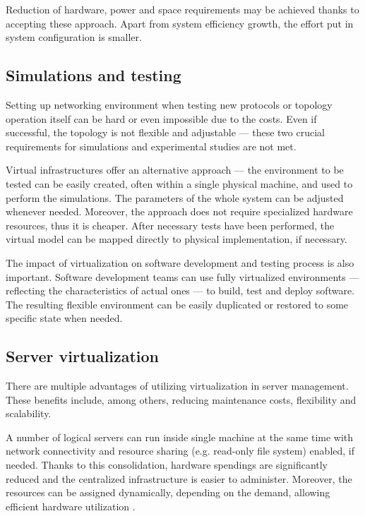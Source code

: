 \documentclass[11pt,openany]{book}
\begin{document}
      Reduction of hardware, power and space requirements may be achieved thanks to accepting these approach. Apart from
      system efficiency growth, the effort put in system configuration is smaller.


      \subsection{Simulations and testing}

        Setting up networking environment when testing new protocols or topology operation itself can be hard or even
        impossible due to the costs. Even if successful, the topology is not flexible and adjustable --- these two
        crucial requirements for simulations and experimental studies are not met.

        Virtual infrastructures offer an alternative approach --- the environment to be tested can be easily created,
        often within a single physical machine, and used to perform the simulations. The parameters of the whole system
        can be adjusted whenever needed. Moreover, the approach does not require specialized hardware resources, thus it
        is cheaper. After necessary tests have been performed, the virtual model can be mapped directly to physical
        implementation, if necessary.

        The impact of virtualization on software development and testing process is also important. Software development
        teams can use fully virtualized environments --- reflecting the characteristics of actual ones --- to build,
        test and deploy software. The resulting flexible environment can be easily duplicated or restored to some
        specific state when needed.


      \subsection{Server virtualization}
        
        There are multiple advantages of utilizing virtualization in server management. These benefits include, among
        others, reducing maintenance costs, flexibility and scalability.

        A number of logical servers can run inside single machine at the same time with network connectivity and
        resource sharing (e.g. read-only file system) enabled, if needed. Thanks to this consolidation, hardware
        spendings are significantly reduced and the centralized infrastructure is easier to administer. Moreover, the
        resources can be assigned dynamically, depending on the demand, allowing efficient hardware utilization
        \cite{server-consolidation}.
\end{document}
